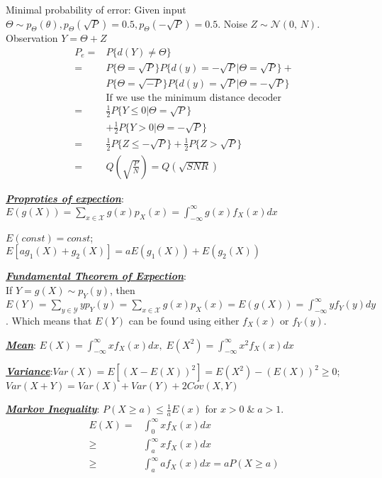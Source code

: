 \documentclass[12pt]{article}
\newcommand{\bulletPoint}[1]{\ul{\textit{\textbf{#1}}}}
\begin{document}
\begin{multicols*}{4}
Minimal probability of error: Given input $\Theta \sim p_\Theta(\theta), p_\Theta(\sqrt{P}) = 0.5, p_\Theta(-\sqrt{P}) = 0.5$. Noise $Z \sim \mathcal{N}(0,\,N)$. Observation $Y = \Theta + Z$
\useshortskip \begin{equation*}
    \begin{split}
        P_e = & P\{ d(Y) \neq \Theta \} \\
            = & P\{ \Theta = \sqrt{P} \} P\{ d(y) = -\sqrt{P} | \Theta = \sqrt{P} \} + \\
              & P\{ \Theta = \sqrt{-P} \} P\{ d(y) = \sqrt{P} | \Theta = - \sqrt{P} \}\\
            & \text{If we use the minimum distance decoder}\\
            = & \frac{1}{2} P\{ Y \leq 0 | \Theta=\sqrt{P} \} \\
            & + \frac{1}{2} P\{ Y > 0 | \Theta=-\sqrt{P} \}\\
            = & \frac{1}{2} P\{ Z \leq -\sqrt{P} \} + \frac{1}{2} P\{ Z > \sqrt{P} \}\\
            = & Q\left( \sqrt{\frac{P}{N}} \right) = Q(\sqrt{SNR})
    \end{split}
\end{equation*}


\bulletPoint{Proproties of expection}:\\
$ E(g(X)) = \sum_{x \in \mathcal{X}}g(x)p_X(x) = \int^{\infty}_{-\infty} g(x)f_X(x)dx$

$E(const) = const$; \\
$E[ag_1(X) + g_2(X)] = a E(g_1(X)) + E(g_2(X))$


\bulletPoint{Fundamental Theorem of Expection}: \\
If $Y = g(X) \sim p_Y(y)$, then $E(Y) = \sum_{y \in \mathcal{Y}}yp_Y(y) = \sum_{x \in \mathcal{X}}g(x)p_X(x) = E(g(X)) = \int^{\infty}_{-\infty}yf_Y(y)dy$. Which means that $E(Y)$ can be found using either $f_X(x)$ or $f_Y(y)$.


\bulletPoint{Mean}:
$E(X) = \int^{\infty}_{-\infty}xf_X(x)dx, \; E(X^2) = \int^{\infty}_{-\infty}x^2f_X(x)dx$


\bulletPoint{Variance}:$Var(X) = E[(X - E(X))^2] = E(X^2) - (E(X))^2 \geq 0$; $Var(X+Y) = Var(X) + Var(Y) + 2Cov(X,Y)$


\bulletPoint{Markov Inequality}: $P(X \geq a) \leq \frac{1}{a}E(x)$ for $x>0 \; \& \; a>1$. 
\useshortskip \begin{equation*}
    \begin{split}
        E(X) = & \int^\infty_{0}xf_X(x)dx \\
        \geq & \int^\infty_{a}xf_X(x)dx \\
        \geq & \int^\infty_{a}af_X(x)dx = a P(X\geq a)
    \end{split}
\end{equation*}



\end{multicols*}
\end{document}
